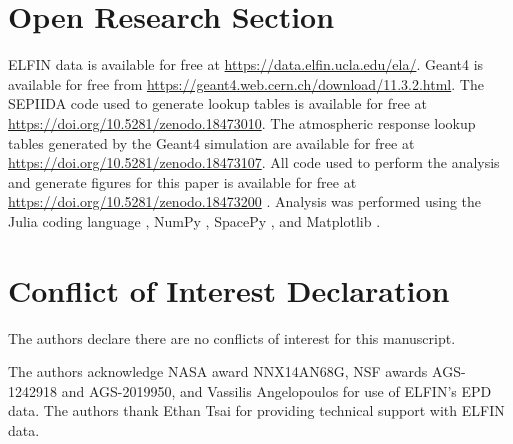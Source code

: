 \documentclass[draft]{agujournal2019}
\begin{document}
\section*{Open Research Section}
ELFIN data \cite{angelopoulos2020} is available for free at \url{https://data.elfin.ucla.edu/ela/}. Geant4 \cite{geant4} is available for free from \url{https://geant4.web.cern.ch/download/11.3.2.html}. The SEPIIDA code used to generate lookup tables is available for free at \url{https://doi.org/10.5281/zenodo.18473010}. The atmospheric response lookup tables generated by the Geant4 simulation are available for free at \url{https://doi.org/10.5281/zenodo.18473107}. All code used to perform the analysis and generate figures for this paper is available for free at \url{https://doi.org/10.5281/zenodo.18473200} . Analysis was performed using the Julia coding language \cite{julia-language}, NumPy \cite{numpy}, SpacePy \cite{spacepy1, spacepy2}, and Matplotlib \cite{matplotlib}.


\section*{Conflict of Interest Declaration}
The authors declare there are no conflicts of interest for this manuscript.

\acknowledgments
The authors acknowledge NASA award NNX14AN68G, NSF awards AGS-1242918 and AGS-2019950, and Vassilis Angelopoulos for use of ELFIN's EPD data. The authors thank Ethan Tsai for providing technical support with ELFIN data.


\end{document}
